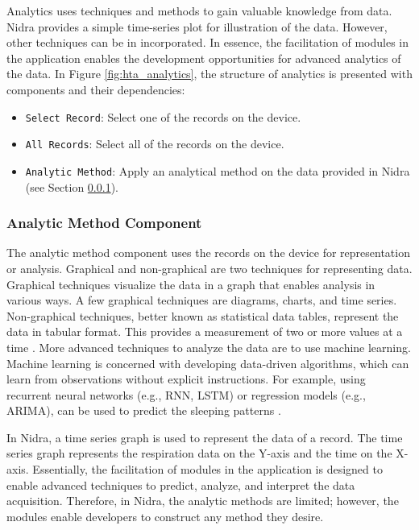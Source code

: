 Analytics uses techniques and methods to gain valuable knowledge from data. Nidra provides a simple time-series plot for illustration of the data. However, other techniques can be in incorporated. In essence, the facilitation of modules in the application enables the development opportunities for advanced analytics of the data. In Figure \ref{fig:hta_analytics}, the structure of analytics is presented with components and their dependencies: 

\begin{itemize}
    \item[4.1.1] \verb|Select Record|: Select one of the records on the device.
    \item[4.1.2] \verb|All Records|: Select all of the records on the device.
    \item[4.2] \verb|Analytic Method|: Apply an analytical method on the data provided in Nidra (see Section \ref{des:amc}).
\end{itemize}

\subsubsection{Analytic Method Component} \label{des:amc}
The analytic method component uses the records on the device for representation or analysis. Graphical and non-graphical are two techniques for representing data. Graphical techniques visualize the data in a graph that enables analysis in various ways. A few graphical techniques are diagrams, charts, and time series. Non-graphical techniques, better known as statistical data tables, represent the data in tabular format. This provides a measurement of two or more values at a time \cite{datarepresentation}. More advanced techniques to analyze the data are to use machine learning. Machine learning is concerned with developing data-driven algorithms, which can learn from observations without explicit instructions. For example, using recurrent neural networks (e.g., RNN, LSTM) or regression models (e.g., ARIMA), can be used to predict the sleeping patterns \cite{machinelearning}.

In Nidra, a time series graph is used to represent the data of a record. The time series graph represents the respiration data on the Y-axis and the time on the X-axis. Essentially, the facilitation of modules in the application is designed to enable advanced techniques to predict, analyze, and interpret the data acquisition. Therefore, in Nidra, the analytic methods are limited; however, the modules enable developers to construct any method they desire. 

